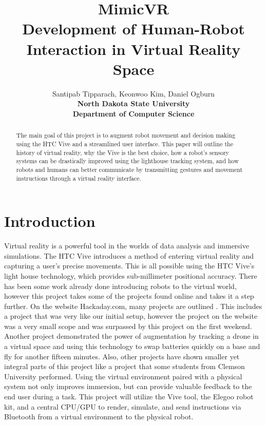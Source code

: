 \documentclass[10pt,a4paper]{article}
\title{\textbf{\Huge MimicVR \\
	\Large  Development of Human-Robot Interaction in Virtual Reality Space}}
\author{Santipab Tipparach, Keonwoo Kim, Daniel Ogburn\\
	\textbf{North Dakota State University}\\\textbf{Department of Computer Science}}
\begin{document}
\maketitle


\begin{abstract}

	The main goal of this project is to augment robot movement and decision making using the HTC Vive and a streamlined user interface. This paper will outline the history of virtual reality, why the Vive is the best choice, how a robot's sensory systems can be drastically improved using the lighthouse tracking system, and how robots and humans can better communicate by transmitting gestures and movement instructions through a virtual reality interface.

\end{abstract}

	\section*{Introduction}
	Virtual reality is a powerful tool in the worlds of data analysis and immersive simulations. The HTC Vive introduces a method of entering virtual reality and capturing a user's precise movements. This is all possible using the HTC Vive's light house technology, which provides sub-millimeter positional accuracy. There has been some work already done introducing robots to the virtual world, however this project takes some of the projects found online and takes it a step further. On the website Hackaday.com, many projects are outlined \cite{hack1}. This includes a project that was very like our initial setup, however the project on the website was a very small scope and was surpassed by this project on the first weekend. Another project demonstrated the power of augmentation by tracking a drone in a virtual space and using this technology to swap batteries quickly on a base and fly for another fifteen minutes. Also, other projects have shown smaller yet integral parts of this project like a project that some students from Clemson University performed. Using the virtual environment paired with a physical system not only improves immersion, but can provide valuable feedback to the end user during a task\cite{Clemson}. This project will utilize the Vive tool, the Elegoo robot kit, and a central CPU/GPU to render, simulate, and send instructions via Bluetooth from a virtual environment to the physical robot.
\end{document}

